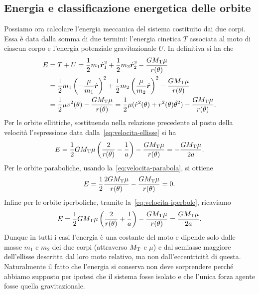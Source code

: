 {\subsection{Energia e classificazione energetica delle orbite}
\label{sec:energia-orbite}

Possiamo ora calcolare l'energia meccanica del sistema costituito dai due
corpi. Essa è data dalla somma di due termini: l'energia cinetica $T$ associata
al moto di ciascun corpo e l'energia potenziale gravitazionale $U$. In
definitiva si ha che
\begin{equation}
  \label{eq:energia}
  \begin{split}
    E &= T + U = \frac{1}{2}m_1\dot{\bm{r}}_1^2 + \frac{1}{2}m_2\dot{\bm{r}}_2^2
    - \frac{GM_\textup{T}\mu}{r(\theta)} \\
    &= \frac{1}{2}m_1
    \left(
      -\frac{\mu}{m_1}\dot{\bm{r}}
    \right)^2 + \frac{1}{2}m_2
    \left(
      \frac{\mu}{m_2}\dot{\bm{r}}
    \right)^2 - \frac{GM_\textup{T}\mu}{r(\theta)} \\
    &= \frac{1}{2}\mu v^2(\theta)
    - \frac{GM_\textup{T}\mu}{r(\theta)} = \frac{1}{2}\mu(\dot{r}^2(\theta) +
    r^2(\theta)\dot{\theta}^2) - \frac{GM_\textup{T}\mu}{r(\theta)}.
  \end{split}
\end{equation}
Per le orbite ellittiche, sostituendo nella relazione precedente al posto della
velocità l'espressione data dalla~\eqref{eq:velocita-ellisse} si ha
\begin{equation}
  \label{eq:energia-ellisse}
  E = \frac{1}{2}GM_\textup{T}\mu
  \left(
    \frac{2}{r(\theta)} - \frac{1}{a}
  \right) - \frac{GM_\textup{T}\mu}{r(\theta)} = -\frac{GM_\textup{T}\mu}{2a}.
\end{equation}
Per le orbite paraboliche, usando la~\eqref{eq:velocita-parabola}, si ottiene
\begin{equation}
  E = \frac{1}{2}\frac{2GM_\textup{T}\mu}{r(\theta)} -
  \frac{GM_\textup{T}\mu}{r(\theta)} = 0.
\end{equation}
Infine per le orbite iperboliche, tramite la~\eqref{eq:velocita-iperbole},
ricaviamo
\begin{equation}
    \label{eq:energia-iperbole}
  E = \frac{1}{2}GM_\textup{T}\mu
  \left(
    \frac{2}{r(\theta)} + \frac{1}{a}
  \right) - \frac{GM_\textup{T}\mu}{r(\theta)} = \frac{GM_\textup{T}\mu}{2a}.
\end{equation}
Dunque in tutti i casi l'energia è una costante del moto e dipende solo dalle
masse $m_1$ e $m_2$ dei due corpi (attraverso $M_\textup{T}$ e $\mu$) e dal
semiasse maggiore dell'ellisse descritta dal loro moto relativo, ma non
dall'eccentricità di questa. Naturalmente il fatto che l'energia si conserva non
deve sorprendere perché abbiamo supposto per ipotesi che il sistema fosse
isolato e che l'unica forza agente fosse quella gravitazionale.

}
